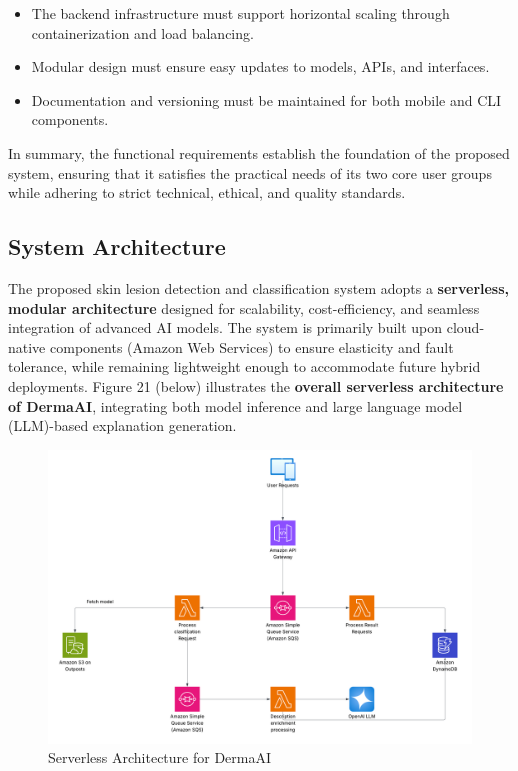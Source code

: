 \documentclass[
  12pt,
  oneside]{article}
\providecommand{\tightlist}{%
  \setlength{\itemsep}{0pt}\setlength{\parskip}{0pt}}
\begin{document}
\begin{itemize}
\tightlist
\item
  The backend infrastructure must support horizontal scaling through
  containerization and load balancing.\\
\item
  Modular design must ensure easy updates to models, APIs, and
  interfaces.\\
\item
  Documentation and versioning must be maintained for both mobile and
  CLI components.
\end{itemize}

In summary, the functional requirements establish the foundation of the
proposed system, ensuring that it satisfies the practical needs of its
two core user groups while adhering to strict technical, ethical, and
quality standards.

\subsection{System Architecture}\label{system-architecture}

The proposed skin lesion detection and classification system adopts a
\textbf{serverless, modular architecture} designed for scalability,
cost-efficiency, and seamless integration of advanced AI models. The
system is primarily built upon cloud-native components (Amazon Web
Services) to ensure elasticity and fault tolerance, while remaining
lightweight enough to accommodate future hybrid deployments. Figure 21
(below) illustrates the \textbf{overall serverless architecture of
DermaAI}, integrating both model inference and large language model
(LLM)-based explanation generation.

\begin{figure}

{\centering \includegraphics[width=0.75\linewidth]{DermaAI-Architecture} 

}

\caption{Serverless Architecture for DermaAI}\label{fig:unnamed-chunk-16}
\end{figure}
\end{document}
